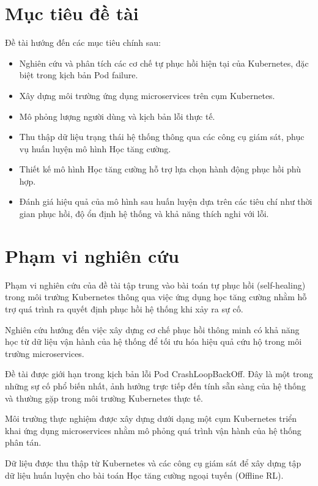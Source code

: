\section{Mục tiêu đề tài}

Đề tài hướng đến các mục tiêu chính sau:
\begin{itemize}
    \item Nghiên cứu và phân tích các cơ chế tự phục hồi hiện tại của Kubernetes, đặc biệt trong 
    kịch bản Pod failure.
    \item Xây dựng môi trường ứng dụng microservices trên cụm Kubernetes. 
    \item Mô phỏng lượng người dùng và kịch bản lỗi thực tế.
    \item Thu thập dữ liệu trạng thái hệ thống thông qua các công cụ giám sát, phục vụ huấn luyện mô hình Học tăng cường.
    \item Thiết kế mô hình Học tăng cường hỗ trợ lựa chọn hành động phục hồi phù hợp.
    \item Đánh giá hiệu quả của mô hình sau huấn luyện dựa trên các tiêu chí như thời gian phục hồi, độ ổn định hệ thống 
    và khả năng thích nghi với lỗi.
\end{itemize}

\section{Phạm vi nghiên cứu}

Phạm vi nghiên cứu của đề tài tập trung vào bài toán tự phục hồi (self-healing)
trong môi trường Kubernetes thông qua việc ứng dụng học tăng cường nhằm hỗ trợ
quá trình ra quyết định phục hồi hệ thống khi xảy ra sự cố.

Nghiên cứu hướng đến việc xây dựng cơ chế phục hồi thông minh có khả năng
học từ dữ liệu vận hành của hệ thống để tối ưu hóa hiệu quả cứu hộ
trong môi trường microservices.

Đề tài được giới hạn trong kịch bản lỗi Pod CrashLoopBackOff. Đây là một
trong những sự cố phổ biến nhất, ảnh hưởng trực tiếp đến tính sẵn sàng
của hệ thống và thường gặp trong môi trường Kubernetes thực tế.

Môi trường thực nghiệm được xây dựng dưới dạng một cụm Kubernetes triển khai
ứng dụng microservices nhằm mô phỏng quá trình vận hành của hệ thống phân tán.

Dữ liệu được thu thập từ Kubernetes và các công cụ giám sát để xây dựng
tập dữ liệu huấn luyện cho bài toán Học tăng cường ngoại tuyến (Offline RL).

